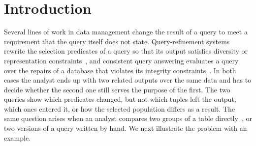 \section{Introduction}
\label{sec:introduction}

Several lines of work in data management change the result of a query to meet a requirement that the query itself does not state.
Query-refinement systems rewrite the selection predicates of a query so that its output satisfies diversity or representation constraints~\cite{LMSJ23,ERICA,SSAD22,CSSM24}, and consistent query answering evaluates a query over the repairs of a database that violates its integrity constraints~\cite{arenas1999,bertossi2006,bertossi2011}.
In both cases the analyst ends up with two related outputs over the same data and has to decide whether the second one still serves the purpose of the first.
The two queries show which predicates changed, but not which tuples left the output, which ones entered it, or how the selected population differs as a result.
The same question arises when an analyst compares two groups of a table directly~\cite{BayPazzani01,TaoGMR22}, or two versions of a query written by hand.
We next illustrate the problem with an example.

